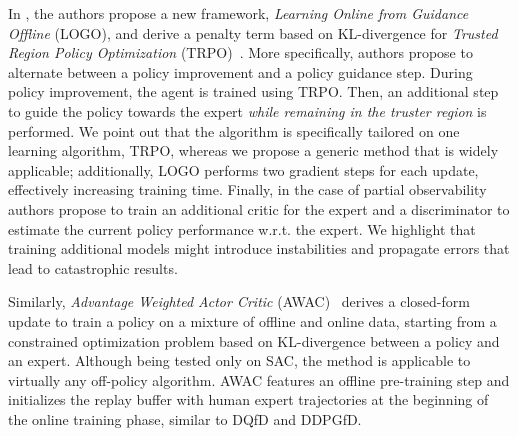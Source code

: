 In \cite{rengarajan2022rlsparse}, the authors propose a new framework, {\em Learning Online from Guidance Offline} (LOGO), and derive a penalty term based on KL-divergence for {\em Trusted Region Policy Optimization} (TRPO)~\cite{schulman2017trpo}. More specifically, authors propose to alternate between a policy improvement and a policy guidance step. During policy improvement, the agent is trained using TRPO. Then, an additional step to guide the policy towards the expert {\em while remaining in the truster region} is performed. We point out that the algorithm is specifically tailored on one learning algorithm, TRPO, whereas we propose a generic method that is widely applicable; additionally, LOGO performs two gradient steps for each update, effectively increasing training time. Finally, in the case of partial observability authors propose to train an additional critic for the expert and a discriminator to estimate the current policy performance w.r.t. the expert. We highlight that training additional models might introduce instabilities and propagate errors that lead to catastrophic results.

Similarly, {\em Advantage Weighted Actor Critic} (AWAC)~\cite{nair2021awac} derives a closed-form update to train a policy on a mixture of offline and online data, starting from a constrained optimization problem based on KL-divergence between a policy and an expert. Although being tested only on SAC, the method is applicable to virtually any off-policy algorithm. AWAC features an offline pre-training step and initializes the replay buffer with human expert trajectories at the beginning of the online training phase, similar to DQfD and DDPGfD.